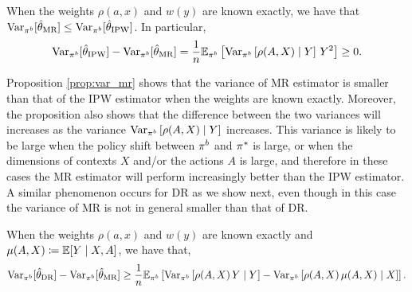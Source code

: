 \begin{proposition}\label{prop:var_mr}
When the weights $\rho(a, x)$ and $w(y)$ are known exactly, we have that $\textup{Var}_{\pi^b}[\hat{\theta}_{\textup{MR}}] \leq \textup{Var}_{\pi^b}[\hat{\theta}_{\textup{IPW}}]$. In particular,
\begin{align*}
    \textup{Var}_{\pi^b}[\hat{\theta}_{\textup{IPW}}] - \textup{Var}_{\pi^b}[\hat{\theta}_{\textup{MR}}]
    = \frac{1}{n} \mathbb{E}_{\pi^b} \left[ \textup{Var}_{\pi^b}\left[ \rho(A, X) \mid Y \right]\, Y^2 \right] \geq 0.
\end{align*}
\end{proposition}
Proposition \ref{prop:var_mr} shows that the variance of MR estimator is smaller than that of the IPW estimator when the weights are known exactly. 
Moreover, the proposition also shows that the difference between the two variances will increases as the variance $\textup{Var}_{\pi^b}\left[ \rho(A, X) \mid Y \right]$ increases. This variance is likely to be large when the policy shift between $\pi^b$ and $\pi^*$ is large, or when the dimensions of contexts $X$ and/or the actions $A$ is large, and therefore in these cases the MR estimator will perform increasingly better than the IPW estimator.
A similar phenomenon occurs for DR as we show next, even though in this case the variance of MR is not in general smaller than that of DR. 

\begin{proposition}\label{prop:var_dr}
When the weights $\rho(a, x)$ and $w(y)$ are known exactly and $\mu(A, X) \coloneqq \mathbb{E}[Y\mid X, A]$, we have that,
\begin{align*}
     \textup{Var}_{\pi^b}[\hat{\theta}_{\textup{DR}}] - \textup{Var}_{\pi^b}[\hat{\theta}_{\textup{MR}}]
    \geq \frac{1}{n} \mathbb{E}_{\pi^b} \left[ \textup{Var}_{\pi^b}\left[\rho(A, X)\,Y \mid Y \right] -  \textup{Var}_{\pi^b}\left[\rho(A, X)\,\mu(A, X) \mid X \right] \right].
\end{align*}
\end{proposition}
